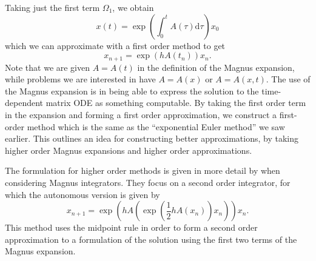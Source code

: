 Taking just the first term $\Omega_1$, we obtain
\begin{equation*}
    x(t) = \exp\left( \int_{0}^{t} A(\tau) \mathrm{d}\tau \right)x_0
\end{equation*}
which we can approximate with a first order method to get
\begin{equation*}
    x_{n+1} = \exp\left( h A(t_n) \right)x_n.
\end{equation*}
Note that we are given $A = A(t)$ in the definition of the Magnus expansion,
while problems we are interested in have $A=A(x)$ or $A=A(x,t)$.
The use of the Magnus expansion is in being able to express the solution to the time-dependent matrix ODE as something computable.
By taking the first order term in the expansion and forming a first order approximation, we construct a first-order method which is the same as the ``exponential Euler method''  we saw earlier.
This outlines an idea for constructing better approximations, by taking higher order Magnus expansions and higher order approximations.

The formulation for higher order methods is given in more detail by \cite{blanes_pos_2022} when considering Magnus integrators.
They focus on a second order integrator, for which the autonomous version is given by
\begin{equation}
    x_{n+1} = \exp\left(h A \left( \exp\left(\frac{1}{2}h A(x_n)\right) x_n \right) \right) x_n.
    \label{eqn:secondordermagnus}
\end{equation}
This method uses the midpoint rule in order to form a second order approximation to a formulation of the solution using the first two terms of the Magnus expansion. 

